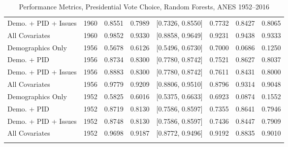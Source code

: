 \begin{longtable}{lrrrlrrr}
  Demo. + PID + Issues & 1960 & 0.8551 & 0.7989 & [0.7326, 0.8550] & 0.7732 & 0.8427 & 0.8065 \\ 
  All Covariates & 1960 & 0.9852 & 0.9330 & [0.8858, 0.9649] & 0.9231 & 0.9438 & 0.9333 \\ 
  Demographics Only & 1956 & 0.5678 & 0.6126 & [0.5496, 0.6730] & 0.7000 & 0.0686 & 0.1250 \\ 
  Demo. + PID & 1956 & 0.8734 & 0.8300 & [0.7780, 0.8742] & 0.7521 & 0.8627 & 0.8037 \\ 
  Demo. + PID + Issues & 1956 & 0.8883 & 0.8300 & [0.7780, 0.8742] & 0.7611 & 0.8431 & 0.8000 \\ 
  All Covariates & 1956 & 0.9779 & 0.9209 & [0.8806, 0.9510] & 0.8796 & 0.9314 & 0.9048 \\ 
  Demographics Only & 1952 & 0.5825 & 0.6016 & [0.5375, 0.6633] & 0.6923 & 0.0874 & 0.1552 \\ 
  Demo. + PID & 1952 & 0.8719 & 0.8130 & [0.7586, 0.8597] & 0.7355 & 0.8641 & 0.7946 \\ 
  Demo. + PID + Issues & 1952 & 0.8748 & 0.8130 & [0.7586, 0.8597] & 0.7436 & 0.8447 & 0.7909 \\ 
  All Covariates & 1952 & 0.9698 & 0.9187 & [0.8772, 0.9496] & 0.9192 & 0.8835 & 0.9010 \\ 
   \bottomrule
\caption{Performance Metrics, Presidential Vote Choice, Random Forests, ANES 1952--2016} 
\label{tab:ANES_prezvote_rf}
\end{longtable}
